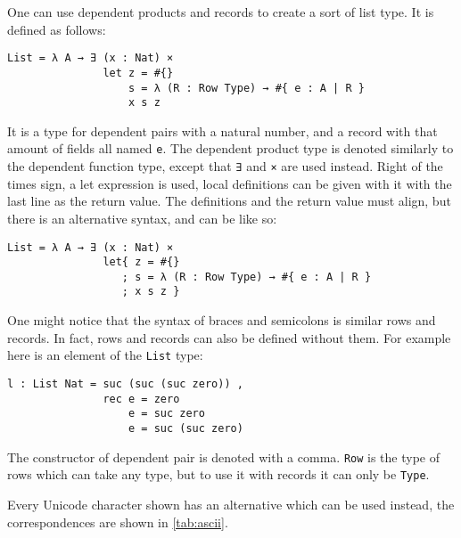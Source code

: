 One can use dependent products and records to create a sort of list type. It is defined as follows:
\begin{verbatim}
List = λ A → ∃ (x : Nat) ×
               let z = #{}
                   s = λ (R : Row Type) → #{ e : A | R }
                   x s z
\end{verbatim}
It is a type for dependent pairs with a natural number, and a record with that
amount of fields all named \texttt{e}. The dependent
product type is denoted similarly to the dependent function type, except that
\texttt{∃} and \texttt{×} are used instead. Right of the times sign, a let expression is used,
local definitions can be given with it with the last line as the return value.
The definitions and the return value must align, but there is an alternative
syntax, and can be like so:
\begin{verbatim}
List = λ A → ∃ (x : Nat) ×
               let{ z = #{}
                  ; s = λ (R : Row Type) → #{ e : A | R }
                  ; x s z }
\end{verbatim}
One might notice that the syntax of braces and semicolons is similar rows and
records. In fact, rows and records can also be defined without them. For example
here is an element of the \texttt{List} type:
\begin{verbatim}
l : List Nat = suc (suc (suc zero)) ,
               rec e = zero
                   e = suc zero
                   e = suc (suc zero)
\end{verbatim}
The constructor of dependent pair is denoted with a comma.
\texttt{Row} is the type of rows which can take any
type, but to use it with records it can only be \texttt{Type}.

Every Unicode character shown has an  alternative which can be used instead, the correspondences are shown in \cref{tab:ascii}.

